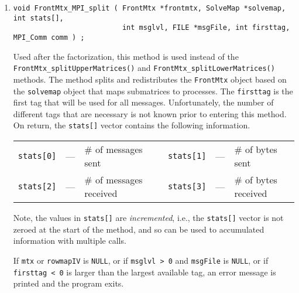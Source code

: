 \begin{enumerate}
\item
\begin{verbatim}
void FrontMtx_MPI_split ( FrontMtx *frontmtx, SolveMap *solvemap, int stats[], 
                          int msglvl, FILE *msgFile, int firsttag, MPI_Comm comm ) ;
\end{verbatim}
Used after the factorization,
this method is used instead of 
the {\tt FrontMtx\_splitUpperMatrices()}
and {\tt FrontMtx\_splitLowerMatrices()} methods.
The method splits and redistributes the {\tt FrontMtx} object based 
on the {\tt solvemap} object that maps submatrices to processes.
The {\tt firsttag} is the first tag that will be used for all messages.
Unfortunately, the number of different tags that are necessary is
not known prior to entering this method.
On return, the {\tt stats[]} vector contains the following
information.
\par
\begin{center}
\begin{tabular}{cclcccl}
{\tt stats[0]} & --- & \# of messages sent 
& &
{\tt stats[1]} & --- & \# of bytes sent \\
{\tt stats[2]} & --- & \# of messages received 
& &
{\tt stats[3]} & --- & \# of bytes received 
\end{tabular}
\end{center}
\par
Note, the values in {\tt stats[]} are {\it incremented}, i.e.,
the {\tt stats[]} vector is not zeroed at the start of the method,
and so can be used to accumulated information with multiple calls.
\par {}
If {\tt mtx} or {\tt rowmapIV} is {\tt NULL},
or if {\tt msglvl > 0} and {\tt msgFile} is {\tt NULL},
or if {\tt firsttag < 0} is larger than the largest available tag,
an error message is printed and the program exits.
\end{enumerate}
\par
